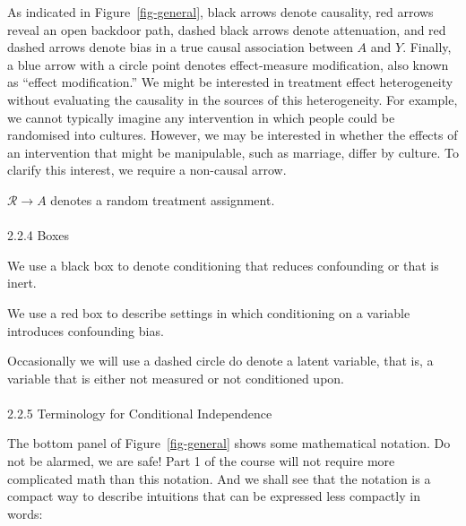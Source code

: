 \documentclass[
  singlecolumn]{article}
\makeatletter
\let\oldparagraph\paragraph
\renewcommand{\paragraph}{
    \@ifstar
      \xxxParagraphStar
      \xxxParagraphNoStar
  }
\newcommand{\xxxParagraphStar}[1]{\oldparagraph*{#1}\mbox{}}
\newcommand{\xxxParagraphNoStar}[1]{\oldparagraph{#1}\mbox{}}
\makeatother
\begin{document}
As indicated in Figure~\ref{fig-general}, black arrows denote causality,
red arrows reveal an open backdoor path, dashed black arrows denote
attenuation, and red dashed arrows denote bias in a true causal
association between \(A\) and \(Y\). Finally, a blue arrow with a circle
point denotes effect-measure modification, also known as ``effect
modification.'' We might be interested in treatment effect heterogeneity
without evaluating the causality in the sources of this heterogeneity.
For example, we cannot typically imagine any intervention in which
people could be randomised into cultures. However, we may be interested
in whether the effects of an intervention that might be manipulable,
such as marriage, differ by culture. To clarify this interest, we
require a non-causal arrow.

\(\mathcal{R}\to A\) denotes a random treatment assignment.

\paragraph{2.2.4 Boxes}\label{boxes}

We use a black box to denote conditioning that reduces confounding or
that is inert.

We use a red box to describe settings in which conditioning on a
variable introduces confounding bias.

Occasionally we will use a dashed circle do denote a latent variable,
that is, a variable that is either not measured or not conditioned upon.

\paragraph{2.2.5 Terminology for Conditional
Independence}\label{terminology-for-conditional-independence}

The bottom panel of Figure~\ref{fig-general} shows some mathematical
notation. Do not be alarmed, we are safe! Part 1 of the course will not
require more complicated math than this notation. And we shall see that
the notation is a compact way to describe intuitions that can be
expressed less compactly in words:
\end{document}
